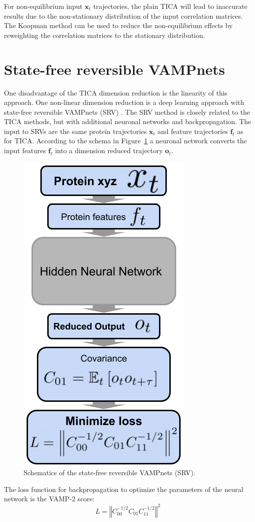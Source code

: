 For non-equilibrium input $\mathbf{x}_{t}$ trajectories, the plain TICA will lead to inaccurate results due to the non-stationary distribution of the input correlation matrices. The Koopman method \cite{koopmanold,
koopman2,koopman3,koopman4, wu2017variational, Nueske2017} can be used to reduce
the non-equilibrium effects by reweighting the correlation matrices to the stationary distribution.

\section{State-free reversible VAMPnets}

One disadvantage of the TICA dimension reduction is the linearity of this approach. One non-linear dimension reduction is a deep learning approach with state-free reversible VAMPnets (SRV) \cite{Mardt2018,chen2019jcp}. The SRV method is closely related to the TICA methods, but with additional neuronal networks and backpropagation. The input to SRVs are the same protein trajectories $\mathbf{x}_{t}$ and feature trajectories $\mathbf{f}_{t}$ as for TICA. According to the schema in Figure~\ref{fig:NN} a neuronal network converts the input features $\mathbf{f}_{t}$ into a dimension reduced trajectory $\mathbf{o}_{t}$.

\begin{figure}[H]
  \centering
  \includegraphics[width=0.4\linewidth]{figures3/NN.png}
  \caption{Schematics of the state-free reversible VAMPnets (SRV).}
  \label{fig:NN}
\end{figure}


The loss function for backpropagation to optimize the parameters of the neural network is the VAMP-2 score:
$$L=\left\Vert C_{00}^{-1/2}C_{01}C_{11}^{-1/2}\right\Vert ^{2}$$

